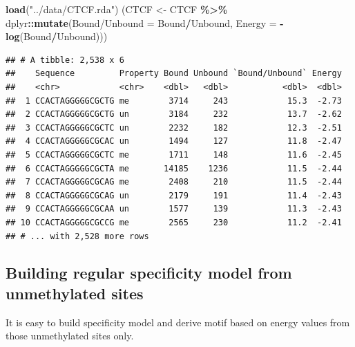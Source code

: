 \documentclass[
]{article}
\newenvironment{Shaded}{\begin{snugshade}}{\end{snugshade}}
\newcommand{\DataTypeTok}[1]{\textcolor[rgb]{0.13,0.29,0.53}{#1}}
\newcommand{\KeywordTok}[1]{\textcolor[rgb]{0.13,0.29,0.53}{\textbf{#1}}}
\newcommand{\NormalTok}[1]{#1}
\newcommand{\OperatorTok}[1]{\textcolor[rgb]{0.81,0.36,0.00}{\textbf{#1}}}
\newcommand{\StringTok}[1]{\textcolor[rgb]{0.31,0.60,0.02}{#1}}
\begin{document}
\begin{Shaded}
\begin{Highlighting}[]
\KeywordTok{load}\NormalTok{(}\StringTok{"../data/CTCF.rda"}\NormalTok{)}
\NormalTok{(CTCF \textless{}{-}}\StringTok{ }\NormalTok{CTCF }\OperatorTok{\%\textgreater{}\%}
\StringTok{  }\NormalTok{dplyr}\OperatorTok{::}\KeywordTok{mutate}\NormalTok{(}\StringTok{\textasciigrave{}}\DataTypeTok{Bound/Unbound}\StringTok{\textasciigrave{}}\NormalTok{ =}\StringTok{ }\NormalTok{Bound}\OperatorTok{/}\NormalTok{Unbound,}
                \DataTypeTok{Energy =} \OperatorTok{{-}}\KeywordTok{log}\NormalTok{(Bound}\OperatorTok{/}\NormalTok{Unbound)))}
\end{Highlighting}
\end{Shaded}

\begin{verbatim}
## # A tibble: 2,538 x 6
##    Sequence         Property Bound Unbound `Bound/Unbound` Energy
##    <chr>            <chr>    <dbl>   <dbl>           <dbl>  <dbl>
##  1 CCACTAGGGGGCGCTG me        3714     243            15.3  -2.73
##  2 CCACTAGGGGGCGCTG un        3184     232            13.7  -2.62
##  3 CCACTAGGGGGCGCTC un        2232     182            12.3  -2.51
##  4 CCACTAGGGGGCGCAC un        1494     127            11.8  -2.47
##  5 CCACTAGGGGGCGCTC me        1711     148            11.6  -2.45
##  6 CCACTAGGGGGCGCTA me       14185    1236            11.5  -2.44
##  7 CCACTAGGGGGCGCAG me        2408     210            11.5  -2.44
##  8 CCACTAGGGGGCGCAG un        2179     191            11.4  -2.43
##  9 CCACTAGGGGGCGCAA un        1577     139            11.3  -2.43
## 10 CCACTAGGGGGCGCCG me        2565     230            11.2  -2.41
## # ... with 2,528 more rows
\end{verbatim}

\hypertarget{building-regular-specificity-model-from-unmethylated-sites}{%
\subsection{Building regular specificity model from unmethylated
sites}\label{building-regular-specificity-model-from-unmethylated-sites}}

It is easy to build specificity model and derive motif based on energy
values from those unmethylated sites only.
\end{document}
